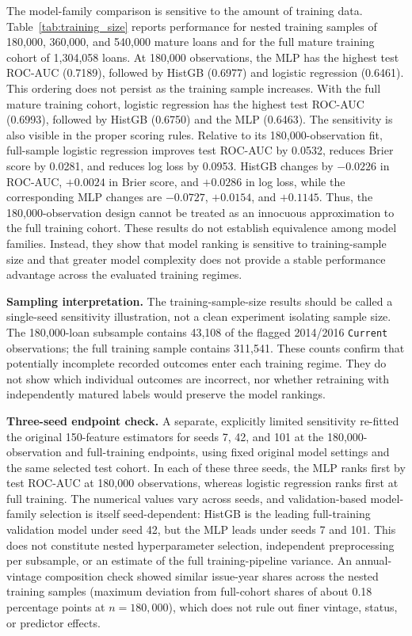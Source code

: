 \documentclass[10pt]{article}
\begin{document}
The model-family comparison is sensitive to the amount of training data. Table~\ref{tab:training_size} reports performance for nested training samples of 180,000, 360,000, and 540,000 mature loans and for the full mature training cohort of 1,304,058 loans. At 180,000 observations, the MLP has the highest test ROC-AUC (0.7189), followed by HistGB (0.6977) and logistic regression (0.6461). This ordering does not persist as the training sample increases. With the full mature training cohort, logistic regression has the highest test ROC-AUC (0.6993), followed by HistGB (0.6750) and the MLP (0.6463). The sensitivity is also visible in the proper scoring rules. Relative to its 180,000-observation fit, full-sample logistic regression improves test ROC-AUC by 0.0532, reduces Brier score by 0.0281, and reduces log loss by 0.0953. HistGB changes by $-0.0226$ in ROC-AUC, $+0.0024$ in Brier score, and $+0.0286$ in log loss, while the corresponding MLP changes are $-0.0727$, $+0.0154$, and $+0.1145$. Thus, the 180,000-observation design cannot be treated as an innocuous approximation to the full training cohort. These results do not establish equivalence among model families. Instead, they show that model ranking is sensitive to training-sample size and that greater model complexity does not provide a stable performance advantage across the evaluated training regimes.



\noindent\textbf{Sampling interpretation.} The training-sample-size results should be called a single-seed sensitivity illustration, not a clean experiment isolating sample size. The 180,000-loan subsample contains 43,108 of the flagged 2014/2016 \texttt{Current} observations; the full training sample contains 311,541. These counts confirm that potentially incomplete recorded outcomes enter each training regime. They do not show which individual outcomes are incorrect, nor whether retraining with independently matured labels would preserve the model rankings.

\noindent\textbf{Three-seed endpoint check.} A separate, explicitly limited sensitivity re-fitted the original 150-feature estimators for seeds 7, 42, and 101 at the 180,000-observation and full-training endpoints, using fixed original model settings and the same selected test cohort. In each of these three seeds, the MLP ranks first by test ROC-AUC at 180,000 observations, whereas logistic regression ranks first at full training. The numerical values vary across seeds, and validation-based model-family selection is itself seed-dependent: HistGB is the leading full-training validation model under seed 42, but the MLP leads under seeds 7 and 101. This does not constitute nested hyperparameter selection, independent preprocessing per subsample, or an estimate of the full training-pipeline variance. An annual-vintage composition check showed similar issue-year shares across the nested training samples (maximum deviation from full-cohort shares of about 0.18 percentage points at $n=180{,}000$), which does not rule out finer vintage, status, or predictor effects.
\end{document}
